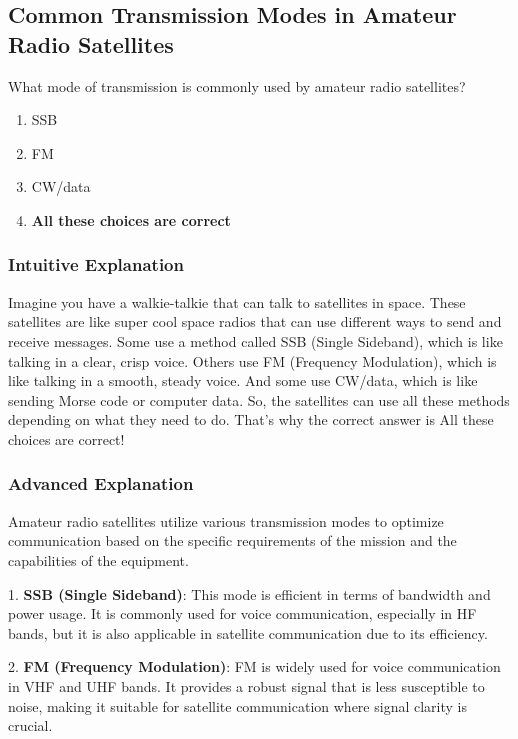 \subsection{Common Transmission Modes in Amateur Radio Satellites}
\label{T8B04}

\begin{tcolorbox}[colback=gray!10!white,colframe=black!75!black,title=T8B04]
What mode of transmission is commonly used by amateur radio satellites?
\begin{enumerate}[label=\Alph*)]
    \item SSB
    \item FM
    \item CW/data
    \item \textbf{All these choices are correct}
\end{enumerate}
\end{tcolorbox}

\subsubsection{Intuitive Explanation}
Imagine you have a walkie-talkie that can talk to satellites in space. These satellites are like super cool space radios that can use different ways to send and receive messages. Some use a method called SSB (Single Sideband), which is like talking in a clear, crisp voice. Others use FM (Frequency Modulation), which is like talking in a smooth, steady voice. And some use CW/data, which is like sending Morse code or computer data. So, the satellites can use all these methods depending on what they need to do. That’s why the correct answer is All these choices are correct!

\subsubsection{Advanced Explanation}
Amateur radio satellites utilize various transmission modes to optimize communication based on the specific requirements of the mission and the capabilities of the equipment. 

1. \textbf{SSB (Single Sideband)}: This mode is efficient in terms of bandwidth and power usage. It is commonly used for voice communication, especially in HF bands, but it is also applicable in satellite communication due to its efficiency.

2. \textbf{FM (Frequency Modulation)}: FM is widely used for voice communication in VHF and UHF bands. It provides a robust signal that is less susceptible to noise, making it suitable for satellite communication where signal clarity is crucial.

